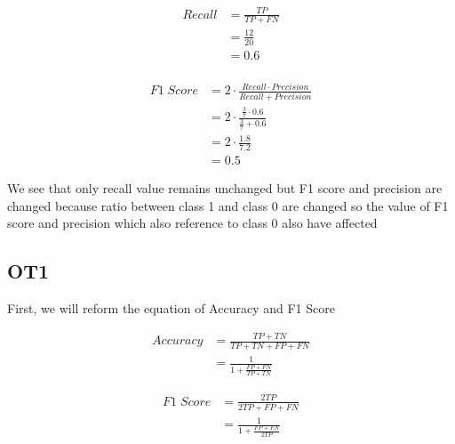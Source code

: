 \documentclass[12pt, a4paper]{article}
\begin{document}
\begin{equation}
    \label{Recall Dog B}
    \begin{split}
        Recall & = \frac{TP}{TP + FN} \\
                & = \frac{12}{20} \\
                & = 0.6 \\
    \end{split}
\end{equation}

\begin{equation}
    \label{F1 Dog B}
    \begin{split}
        F1\;Score & = 2 \cdot \frac{Recall \cdot Precision}{Recall + Precision} \\
                    & = 2 \cdot \frac{\frac{3}{7} \cdot 0.6}{\frac{3}{7} + 0.6} \\
                    & = 2 \cdot \frac{1.8}{7.2} \\
                    & = 0.5
    \end{split}
\end{equation}

We see that only recall value remains unchanged but F1 score and precision are changed because ratio between class 1 and class 0 are changed 
so the value of F1 score and precision which also reference to class 0 also have affected

\subsection{OT1}

First, we will reform the equation of Accuracy and F1 Score

\begin{equation}
    \label{Accuracy OT1}
    \begin{split}
        Accuracy & = \frac{TP + TN}{TP + TN + FP + FN} \\
                & = \frac{1}{1 + \frac{FP + FN}{TP + TN}}
    \end{split}
\end{equation}

\begin{equation}
    \label{F1 Score OT1}
    \begin{split}
        F1\;Score & = \frac{2TP}{2TP + FP + FN} \\
                & = \frac{1}{1 + \frac{FP + FN}{2TP}}
    \end{split}
\end{equation}
\end{document}
